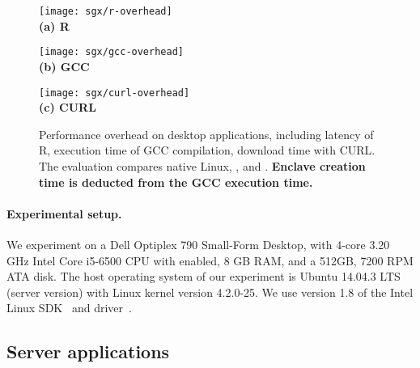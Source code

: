 
\begin{figure*}[t!]
\centering

\begin{minipage}{.42\textwidth}
\centering
\texttt{[image: sgx/r-overhead]}\\
{\bf (a) R}
\end{minipage}
\begin{minipage}{.25\textwidth}
\centering
\texttt{[image: sgx/gcc-overhead]}\\
{\bf (b) GCC}
\end{minipage}
\begin{minipage}{.25\textwidth}
\centering
\texttt{[image: sgx/curl-overhead]}\\
{\bf (c) CURL}
\end{minipage}

\caption{Performance overhead on desktop applications, including latency of R, execution time of GCC compilation, download time with CURL. The evaluation compares native Linux, \graphene{}, and \graphenesgx{}. {\bf Enclave creation time is deducted from the GCC execution time.}}
\label{fig:desktop-overhead}
\end{figure*}


\paragraph{Experimental setup.}

We experiment on a Dell Optiplex 790 Small-Form Desktop,
with 4-core 3.20 GHz Intel Core i5-6500 CPU with \sgx{} enabled,
8 GB RAM, and a 512GB, 7200 RPM ATA disk.
The host operating system of our experiment is Ubuntu 14.04.3 LTS (server version) with Linux kernel version 4.2.0-25.
We use version 1.8 of 
the Intel \sgx{} Linux SDK~\cite{intel-sgx-linux-sdk} and driver~\cite{intel-sgx-linux-driver}.


\subsection{Server applications}

